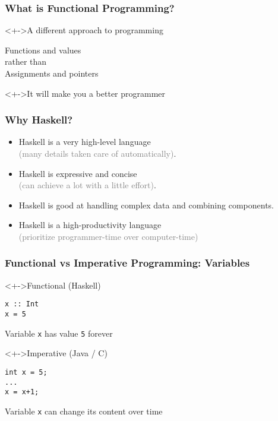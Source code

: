 \documentclass{beamer}
\begin{document}
\begin{frame}
  \frametitle{What is Functional Programming?}
  \begin{block}<+->{A different approach to programming}
    \begin{LARGE}
      \begin{center}
        Functions and values
        \\[3ex]
        rather than
        \\[3ex]
        Assignments and pointers
      \end{center}
    \end{LARGE}
  \end{block}
  \begin{alertblock}<+->{It will make you a better programmer}
    
  \end{alertblock}
\end{frame}
\begin{frame}
  \frametitle{Why Haskell?}
  \begin{itemize}
  \item Haskell is a very high-level language
    \\\hfill\textcolor{gray}{(many details taken care
    of automatically)}. 
  \item Haskell is expressive and concise
    \\\hfill\textcolor{gray}{(can achieve a lot with a
    little effort)}. 
  \item Haskell is good at handling complex data and combining
    components. 
  \item Haskell is a high-productivity language \\\hfill\textcolor{gray}{ (prioritize programmer-time over computer-time)}
  \end{itemize}
\end{frame}

\begin{frame}[fragile]
  \frametitle{Functional vs Imperative Programming: Variables}
  \begin{block}<+->{Functional (Haskell)}
\begin{verbatim}
x :: Int
x = 5
\end{verbatim}
    Variable \texttt{x} has value \texttt{5} forever
  \end{block}
  \begin{block}<+->{Imperative (Java / C)}
\begin{verbatim}
int x = 5;
...
x = x+1;
\end{verbatim}
    Variable \texttt{x} can change its content over time
  \end{block}
\end{frame}
\end{document}
